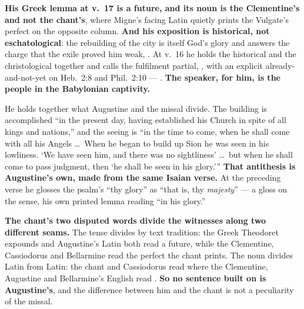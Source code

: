 \begin{witnessnote}
\textbf{His Greek lemma at v.~17 is a future, and its noun is the Clementine's
and not the chant's}, where Migne's facing Latin quietly prints the Vulgate's
perfect  on the opposite column. \textbf{And his exposition is historical, not
eschatological}: the rebuilding of the city is itself God's glory and answers the
charge that the exile proved him weak, . At v.~16 he holds the historical
and the christological together and calls the fulfilment partial, , with an
explicit already-and-not-yet on Heb.~2:8 and Phil.~2:10 --- . \textbf{The speaker, for him, is the people in the Babylonian
captivity.}
\end{witnessnote}

\begin{witnessnote}
He holds together what Augustine and the missal divide. The building is
accomplished ``in the present day, having established his Church in spite of all
kings and nations,'' and the seeing is ``in the time to come, when he shall come
with all his Angels \dots\ When he began to build up Sion he was seen in his
lowliness. `We have seen him, and there was no sightliness' \dots\ but when he
shall come to pass judgment, then `he shall be seen in his glory.''' \textbf{That
antithesis is Augustine's own, made from the same Isaian verse.} At the preceding
verse he glosses the psalm's ``thy glory'' as ``that is, thy \emph{majesty}'' ---
a gloss on the sense, his own printed lemma reading ``in his glory.''
\end{witnessnote}

\textbf{The chant's two disputed words divide the witnesses along two different
seams.} The tense divides by text tradition: the Greek Theodoret expounds and
Augustine's Latin both read a future, while the Clementine, Cassiodorus and
Bellarmine read the perfect the chant prints. The noun divides Latin from Latin:
the chant and Cassiodorus read  where the Clementine, Augustine
and Bellarmine's English read . \textbf{So no sentence built on
 is Augustine's}, and the difference between him and the chant
is not a peculiarity of the missal.

